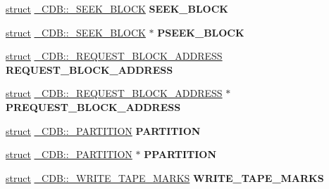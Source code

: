 \begin{DoxyCompactItemize}
\item 
\mbox{\label{union___c_d_b_a7eeff27494b282e21c3935fe2a23ae4f}} 
\hyperlink{interfacestruct}{struct} \hyperlink{struct___c_d_b_1_1___s_e_e_k___b_l_o_c_k}{\+\_\+\+C\+D\+B\+::\+\_\+\+S\+E\+E\+K\+\_\+\+B\+L\+O\+CK} {\bfseries S\+E\+E\+K\+\_\+\+B\+L\+O\+CK}
\item 
\mbox{\label{union___c_d_b_a54430d76adf657b7bbf130eaf018dd10}} 
\hyperlink{interfacestruct}{struct} \hyperlink{struct___c_d_b_1_1___s_e_e_k___b_l_o_c_k}{\+\_\+\+C\+D\+B\+::\+\_\+\+S\+E\+E\+K\+\_\+\+B\+L\+O\+CK} $\ast$ {\bfseries P\+S\+E\+E\+K\+\_\+\+B\+L\+O\+CK}
\item 
\mbox{\label{union___c_d_b_a15cc41c2c7e199038dbb9283f257ae76}} 
\hyperlink{interfacestruct}{struct} \hyperlink{struct___c_d_b_1_1___r_e_q_u_e_s_t___b_l_o_c_k___a_d_d_r_e_s_s}{\+\_\+\+C\+D\+B\+::\+\_\+\+R\+E\+Q\+U\+E\+S\+T\+\_\+\+B\+L\+O\+C\+K\+\_\+\+A\+D\+D\+R\+E\+SS} {\bfseries R\+E\+Q\+U\+E\+S\+T\+\_\+\+B\+L\+O\+C\+K\+\_\+\+A\+D\+D\+R\+E\+SS}
\item 
\mbox{\label{union___c_d_b_a6ee3b05cc6bbdaf30fa0352a05466571}} 
\hyperlink{interfacestruct}{struct} \hyperlink{struct___c_d_b_1_1___r_e_q_u_e_s_t___b_l_o_c_k___a_d_d_r_e_s_s}{\+\_\+\+C\+D\+B\+::\+\_\+\+R\+E\+Q\+U\+E\+S\+T\+\_\+\+B\+L\+O\+C\+K\+\_\+\+A\+D\+D\+R\+E\+SS} $\ast$ {\bfseries P\+R\+E\+Q\+U\+E\+S\+T\+\_\+\+B\+L\+O\+C\+K\+\_\+\+A\+D\+D\+R\+E\+SS}
\item 
\mbox{\label{union___c_d_b_ab3dc5436bc7e3468f2bba4810d9e5d39}} 
\hyperlink{interfacestruct}{struct} \hyperlink{struct___c_d_b_1_1___p_a_r_t_i_t_i_o_n}{\+\_\+\+C\+D\+B\+::\+\_\+\+P\+A\+R\+T\+I\+T\+I\+ON} {\bfseries P\+A\+R\+T\+I\+T\+I\+ON}
\item 
\mbox{\label{union___c_d_b_a98b8f963cd5f5d2ba79b349f0d53c85a}} 
\hyperlink{interfacestruct}{struct} \hyperlink{struct___c_d_b_1_1___p_a_r_t_i_t_i_o_n}{\+\_\+\+C\+D\+B\+::\+\_\+\+P\+A\+R\+T\+I\+T\+I\+ON} $\ast$ {\bfseries P\+P\+A\+R\+T\+I\+T\+I\+ON}
\item 
\mbox{\label{union___c_d_b_a59438906693f4408bba9ef916115a6ff}} 
\hyperlink{interfacestruct}{struct} \hyperlink{struct___c_d_b_1_1___w_r_i_t_e___t_a_p_e___m_a_r_k_s}{\+\_\+\+C\+D\+B\+::\+\_\+\+W\+R\+I\+T\+E\+\_\+\+T\+A\+P\+E\+\_\+\+M\+A\+R\+KS} {\bfseries W\+R\+I\+T\+E\+\_\+\+T\+A\+P\+E\+\_\+\+M\+A\+R\+KS}

\end{DoxyCompactItemize}
